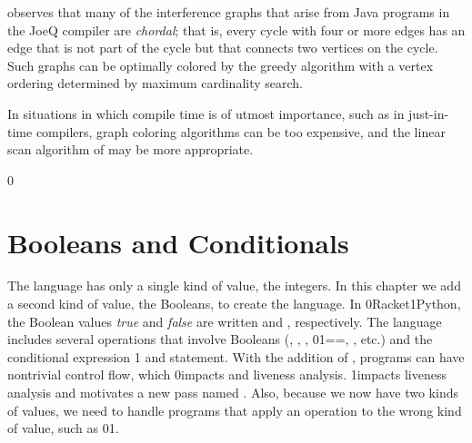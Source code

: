 \documentclass[7x10]{TimesAPriori_MIT}%
\def\racketEd{0}
\def\pythonEd{1}
\def\edition{1}
\newcommand{\racket}[1]{{\if\edition\racketEd{#1}\fi}}
\newcommand{\pythonColor}[0]{}
\newcommand{\python}[1]{{\if\edition\pythonEd\pythonColor #1\fi}}
\numberwithin{theorem}{chapter}
\numberwithin{definition}{chapter}
\numberwithin{equation}{chapter}
\begin{document}


\citet{Palsberg:2007si} observes that many of the interference graphs
that arise from Java programs in the JoeQ compiler are \emph{chordal};
that is, every cycle with four or more edges has an edge that is not
part of the cycle but that connects two vertices on the cycle. Such
graphs can be optimally colored by the greedy algorithm with a vertex
ordering determined by maximum cardinality search.

In situations in which compile time is of utmost importance, such as
in just-in-time compilers, graph coloring algorithms can be too
expensive, and the linear scan algorithm of \citet{Poletto:1999uq} may
be more appropriate.


{\if\edition\racketEd
{}
\fi}
\chapter{Booleans and Conditionals}
\label{ch:Lif}
\setcounter{footnote}{0}

The \LangVar{} language has only a single kind of value, the
integers. In this chapter we add a second kind of value, the Booleans,
to create the \LangIf{} language. In \racket{Racket}\python{Python},
the Boolean values \emph{true} and \emph{false}
are written
\TRUE{} and
\FALSE{}, respectively.  The \LangIf{}
language includes several operations that involve Booleans
(,
,
,
\racket{}\python{==},
\key{<}, etc.) and the
conditional expression%
\python{ and statement}.
With the addition of , programs can have
nontrivial control flow, which
%
\racket{impacts  and liveness analysis.}%
%
\python{impacts liveness analysis and motivates a new pass named
  \code{explicate\_control}.}
%
Also, because we now have two kinds of values, we need to handle
programs that apply an operation to the wrong kind of value, such as
\racket{}\python{}.
\end{document}
